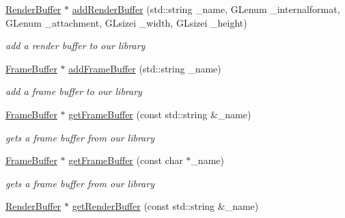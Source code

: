 \begin{DoxyCompactItemize}
\item 
\hyperlink{class_render_buffer}{Render\-Buffer} $\ast$ \hyperlink{class_render_target_lib_a0ff27ec9ae3c085a2bce4e05c180e0e3}{add\-Render\-Buffer} (std\-::string \-\_\-name, G\-Lenum \-\_\-internalformat, G\-Lenum \-\_\-attachment, G\-Lsizei \-\_\-width, G\-Lsizei \-\_\-height)
\begin{DoxyCompactList}\small\item\em add a render buffer to our library \end{DoxyCompactList}\item 
\hypertarget{class_render_target_lib_ac5971bca0f97cedf1e7c16d8d1233fdc}{\hyperlink{class_frame_buffer}{Frame\-Buffer} $\ast$ \hyperlink{class_render_target_lib_ac5971bca0f97cedf1e7c16d8d1233fdc}{add\-Frame\-Buffer} (std\-::string \-\_\-name)}\label{class_render_target_lib_ac5971bca0f97cedf1e7c16d8d1233fdc}

\begin{DoxyCompactList}\small\item\em add a frame buffer to our library \end{DoxyCompactList}\item 
\hypertarget{class_render_target_lib_a30afc5063831926612da80726dea0f04}{\hyperlink{class_frame_buffer}{Frame\-Buffer} $\ast$ \hyperlink{class_render_target_lib_a30afc5063831926612da80726dea0f04}{get\-Frame\-Buffer} (const std\-::string \&\-\_\-name)}\label{class_render_target_lib_a30afc5063831926612da80726dea0f04}

\begin{DoxyCompactList}\small\item\em gets a frame buffer from our library \end{DoxyCompactList}\item 
\hypertarget{class_render_target_lib_a9695e1a845c84e76c10bec26460b0e8b}{\hyperlink{class_frame_buffer}{Frame\-Buffer} $\ast$ \hyperlink{class_render_target_lib_a9695e1a845c84e76c10bec26460b0e8b}{get\-Frame\-Buffer} (const char $\ast$\-\_\-name)}\label{class_render_target_lib_a9695e1a845c84e76c10bec26460b0e8b}

\begin{DoxyCompactList}\small\item\em gets a frame buffer from our library \end{DoxyCompactList}\item 
\hypertarget{class_render_target_lib_acf1fa30e68dc74deca512b0c77786d0a}{\hyperlink{class_render_buffer}{Render\-Buffer} $\ast$ \hyperlink{class_render_target_lib_acf1fa30e68dc74deca512b0c77786d0a}{get\-Render\-Buffer} (const std\-::string \&\-\_\-name)}\label{class_render_target_lib_acf1fa30e68dc74deca512b0c77786d0a}


\end{DoxyCompactItemize}
